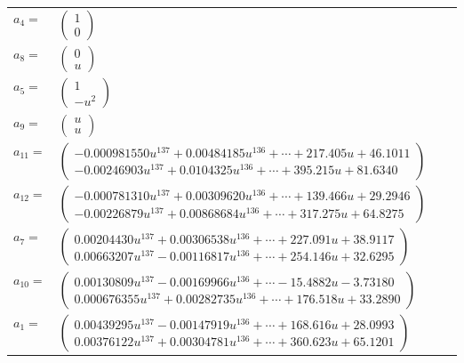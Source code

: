 \documentclass[1p]{elsarticle_modified}
\theoremstyle{definition}
\begin{document}
\begin{tabular}{m{7pt} m{180pt} m{7pt} m{180pt} }
\flushright $a_{4}=$&$\begin{pmatrix}1\\0\end{pmatrix}$ \\
\flushright $a_{8}=$&$\begin{pmatrix}0\\u\end{pmatrix}$ \\
\flushright $a_{5}=$&$\begin{pmatrix}1\\- u^2\end{pmatrix}$ \\
\flushright $a_{9}=$&$\begin{pmatrix}u\\u\end{pmatrix}$ \\
\flushright $a_{11}=$&$\begin{pmatrix}-0.000981550 u^{137}+0.00484185 u^{136}+\cdots+217.405 u+46.1011\\-0.00246903 u^{137}+0.0104325 u^{136}+\cdots+395.215 u+81.6340\end{pmatrix}$ \\
\flushright $a_{12}=$&$\begin{pmatrix}-0.000781310 u^{137}+0.00309620 u^{136}+\cdots+139.466 u+29.2946\\-0.00226879 u^{137}+0.00868684 u^{136}+\cdots+317.275 u+64.8275\end{pmatrix}$ \\
\flushright $a_{7}=$&$\begin{pmatrix}0.00204430 u^{137}+0.00306538 u^{136}+\cdots+227.091 u+38.9117\\0.00663207 u^{137}-0.00116817 u^{136}+\cdots+254.146 u+32.6295\end{pmatrix}$ \\
\flushright $a_{10}=$&$\begin{pmatrix}0.00130809 u^{137}-0.00169966 u^{136}+\cdots-15.4882 u-3.73180\\0.000676355 u^{137}+0.00282735 u^{136}+\cdots+176.518 u+33.2890\end{pmatrix}$ \\
\flushright $a_{1}=$&$\begin{pmatrix}0.00439295 u^{137}-0.00147919 u^{136}+\cdots+168.616 u+28.0993\\0.00376122 u^{137}+0.00304781 u^{136}+\cdots+360.623 u+65.1201\end{pmatrix}$ \\

\end{tabular}
\end{document}

